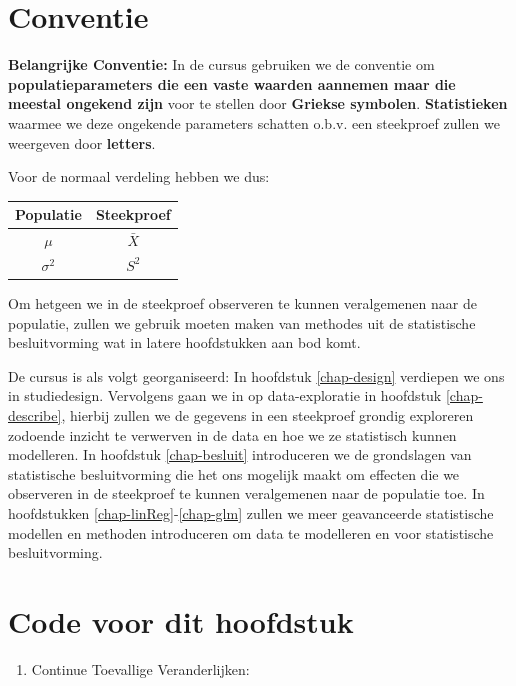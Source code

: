 \documentclass[
  12pt,dutch,coursenotes]{book}
\providecommand{\tightlist}{%
  \setlength{\itemsep}{0pt}\setlength{\parskip}{0pt}}
\theoremstyle{definition}
\theoremstyle{definition}
\theoremstyle{definition}
\theoremstyle{definition}
\theoremstyle{remark}
\begin{document}
\hypertarget{conventie}{%
\section{Conventie}\label{conventie}}

\textbf{Belangrijke Conventie:} In de cursus gebruiken we de conventie om \textbf{populatieparameters die een vaste waarden aannemen maar die meestal ongekend zijn} voor te stellen door \textbf{Griekse symbolen}. \textbf{Statistieken} waarmee we deze ongekende parameters schatten o.b.v. een steekproef zullen we weergeven door \textbf{letters}.

Voor de normaal verdeling hebben we dus:

\begin{longtable}[]{@{}cc@{}}
\toprule
Populatie & Steekproef \\
\midrule
\endhead
\(\mu\) & \(\bar X\) \\
\(\sigma^2\) & \(S^2\) \\
\bottomrule
\end{longtable}

Om hetgeen we in de steekproef observeren te kunnen veralgemenen naar de populatie, zullen we gebruik moeten maken van methodes uit de statistische besluitvorming wat in latere hoofdstukken aan bod komt.

De cursus is als volgt georganiseerd:
In hoofdstuk \ref{chap-design} verdiepen we ons in studiedesign. Vervolgens gaan we in op data-exploratie in hoofdstuk \ref{chap-describe}, hierbij zullen we de gegevens in een steekproef grondig exploreren zodoende inzicht te verwerven in de data en hoe we ze statistisch kunnen modelleren.
In hoofdstuk \ref{chap-besluit} introduceren we de grondslagen van statistische besluitvorming die het ons mogelijk maakt om effecten die we observeren in de steekproef te kunnen veralgemenen naar de populatie toe.
In hoofdstukken \ref{chap-linReg}-\ref{chap-glm} zullen we meer geavanceerde statistische modellen en methoden introduceren om data te modelleren en voor statistische besluitvorming.

\hypertarget{code-voor-dit-hoofdstuk}{%
\section{Code voor dit hoofdstuk}\label{code-voor-dit-hoofdstuk}}

\begin{enumerate}
\def\labelenumi{\arabic{enumi}.}
\tightlist
\item
  Continue Toevallige Veranderlijken:
\end{enumerate}
\end{document}
